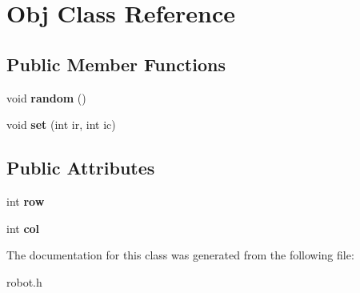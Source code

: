 \hypertarget{classObj}{\section{Obj Class Reference}
\label{classObj}
}
\subsection*{Public Member Functions}
\begin{DoxyCompactItemize}
\item 
\hypertarget{classObj_a6bd434ff444808f507e73868e1a3811e}{void {\bfseries random} ()}\label{classObj_a6bd434ff444808f507e73868e1a3811e}

\item 
\hypertarget{classObj_ab626ae12167372b1432c871842279e78}{void {\bfseries set} (int ir, int ic)}\label{classObj_ab626ae12167372b1432c871842279e78}

\end{DoxyCompactItemize}
\subsection*{Public Attributes}
\begin{DoxyCompactItemize}
\item 
\hypertarget{classObj_a8371ea5021c815b409eabcbafc1cc674}{int {\bfseries row}}\label{classObj_a8371ea5021c815b409eabcbafc1cc674}

\item 
\hypertarget{classObj_ad6fe3e1c1129967f4ad9e225d5ac2e79}{int {\bfseries col}}\label{classObj_ad6fe3e1c1129967f4ad9e225d5ac2e79}

\end{DoxyCompactItemize}


The documentation for this class was generated from the following file\+:\begin{DoxyCompactItemize}
\item 
robot.\+h\end{DoxyCompactItemize}
